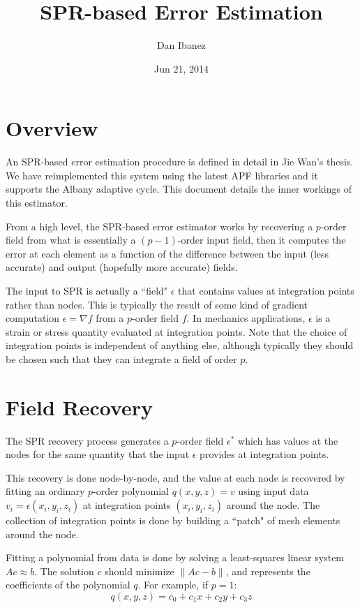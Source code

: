 \documentclass{article}
\title{SPR-based Error Estimation}
\author{Dan Ibanez}
\date{Jun 21, 2014}
\begin{document}
\maketitle

\section{Overview}
An SPR-based error estimation procedure is defined in detail
in Jie Wan's thesis.
We have reimplemented this system using the latest APF
libraries and it supports the Albany adaptive cycle.
This document details the inner workings of this estimator.

From a high level, the SPR-based error estimator works by
recovering a $p$-order field from what is essentially
a $(p-1)$-order input field, then it computes the
error at each element as a function of the difference
between the input (less accurate) and output
(hopefully more accurate) fields. 

The input to SPR is actually a ``field" $\epsilon$ that contains values
at integration points rather than nodes.
This is typically the result of some kind of gradient computation
$\epsilon = \nabla f$ from a $p$-order field $f$.
In mechanics applications, $\epsilon$ is a strain or stress quantity
evaluated at integration points.
Note that the choice of integration points is independent of
anything else, although typically they should be chosen such
that they can integrate a field of order $p$.

\section{Field Recovery}
The SPR recovery process generates a $p$-order field $\epsilon^*$ which
has values at the nodes for the same quantity that the
input $\epsilon$ provides at integration points.

This recovery is done node-by-node, and the value at each
node is recovered by fitting an ordinary $p$-order polynomial
$q (x, y, z) = v$ using input data $v_i = \epsilon(x_i, y_i, z_i)$
at integration points $(x_i,y_i,z_i)$ around the node.
The collection of integration points is done by building
a ``patch" of mesh elements around the node.

Fitting a polynomial from data is done by solving a least-squares linear
system $Ac \approx b$.
The solution $c$ should minimize $\|Ac - b\|$, and represents
the coefficients of the polynomial $q$.
For example, if $p=1$:
\[q(x,y,z) = c_0 + c_1 x + c_2 y + c_3 z \]
\end{document}
